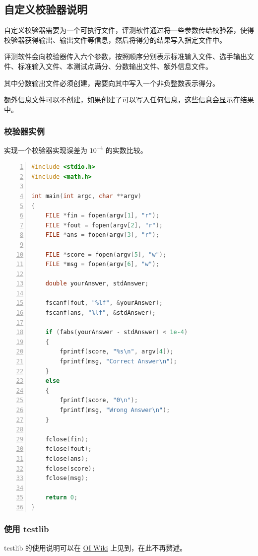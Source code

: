 \documentclass[12pt, a4paper]{article}
\begin{document}
\subsection{自定义校验器说明}
自定义校验器需要为一个可执行文件，评测软件通过将一些参数传给校验器，使得校验器获得输出、输出文件等信息，然后将得分的结果写入指定文件中。

评测软件会向校验器传入六个参数，按照顺序分别表示标准输入文件、选手输出文件、标准输入文件、本测试点满分、分数输出文件、额外信息文件。

其中分数输出文件必须创建，需要向其中写入一个非负整数表示得分。

额外信息文件可以不创建，如果创建了可以写入任何信息，这些信息会显示在结果中。

\subsubsection{校验器实例}
实现一个校验器实现误差为 $10^{-4}$ 的实数比较。

\newpage

\begin{lstlisting}[language={C++},numbers=left,frame=shadowbox,showspaces=false,showstringspaces=false
	rulesepcolor=\color{red!20!green!20!blue!20},
	keywordstyle=\color{blue!70!black},
	commentstyle=\color{blue!90!},
	basicstyle=\ttfamily]
#include <stdio.h>
#include <math.h>

int main(int argc, char **argv)
{
	FILE *fin = fopen(argv[1], "r");
	FILE *fout = fopen(argv[2], "r");
	FILE *ans = fopen(argv[3], "r");

	FILE *score = fopen(argv[5], "w");
	FILE *msg = fopen(argv[6], "w");

	double yourAnswer, stdAnswer;

	fscanf(fout, "%lf", &yourAnswer);
	fscanf(ans, "%lf", &stdAnswer);

	if (fabs(yourAnswer - stdAnswer) < 1e-4)
	{
		fprintf(score, "%s\n", argv[4]);
		fprintf(msg, "Correct Answer\n");
	}
	else
	{
		fprintf(score, "0\n");
		fprintf(msg, "Wrong Answer\n");
	}

	fclose(fin);
	fclose(fout);
	fclose(ans);
	fclose(score);
	fclose(msg);

	return 0;
}
\end{lstlisting}

\subsubsection{使用 testlib}
testlib 的使用说明可以在 \href{https://oi-wiki.org/intro/testlib/}{OI Wiki} 上见到，在此不再赘述。
\end{document}

